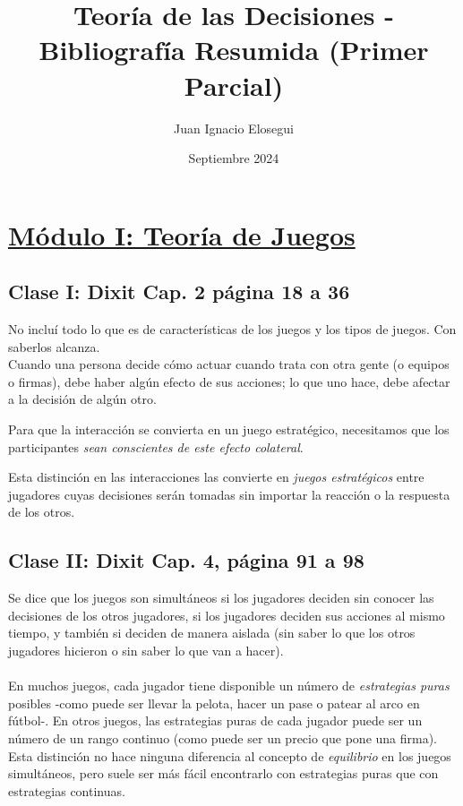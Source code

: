 \documentclass{article}
\title{Teoría de las Decisiones - Bibliografía Resumida (Primer Parcial)}
\author{Juan Ignacio Elosegui}
\date{Septiembre 2024}
\begin{document}
\maketitle

\newpage

\section*{\underline{Módulo I: Teoría de Juegos}}
    \subsection*{\textbf{Clase I: Dixit Cap. 2 página 18 a 36}}
        No incluí todo lo que es de características de los juegos y los tipos de juegos. Con saberlos alcanza.
        \\
        Cuando una persona decide cómo actuar cuando trata con otra gente (o equipos o firmas), debe haber algún efecto de sus acciones; lo que uno hace, debe afectar a la decisión de algún otro.

        Para que la interacción se convierta en un juego estratégico, necesitamos que los participantes \emph{sean conscientes de este efecto colateral}.

        Esta distinción en las interacciones las convierte en \emph{juegos estratégicos} entre jugadores cuyas decisiones serán tomadas sin importar la reacción o la respuesta de los otros.

    
    \subsection*{\textbf{Clase II: Dixit Cap. 4, página 91 a 98}}
        Se dice que los juegos son simultáneos si los jugadores deciden sin conocer las decisiones de los otros jugadores, si los jugadores deciden sus acciones al mismo tiempo, y también si deciden de manera aislada (sin saber lo que los otros jugadores hicieron o sin saber lo que van a hacer).
        \\
        \\
        En muchos juegos, cada jugador tiene disponible un número de \emph{estrategias puras} posibles -como puede ser llevar la pelota, hacer un pase o patear al arco en fútbol-. En otros juegos, las estrategias puras de cada jugador puede ser un número de un rango continuo (como puede ser un precio que pone una firma). Esta distinción no hace ninguna diferencia al concepto de \emph{equilibrio} en los juegos simultáneos, pero suele ser más fácil encontrarlo con estrategias puras que con estrategias continuas.
\end{document}

